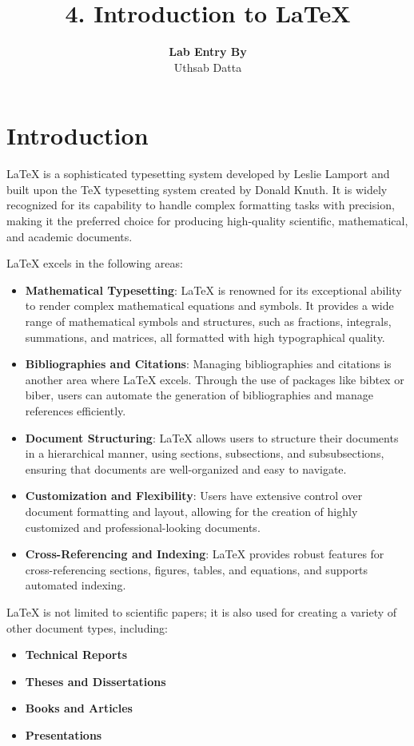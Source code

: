 \documentclass{article}
\title{\centering \LARGE \textbf{4. Introduction to LaTeX} \\[0.5cm]}
\author{\centering \Large \textbf{Lab Entry By} \\[0.5cm] \large Uthsab Datta}
\date{} %
\begin{document}
\maketitle

\section{Introduction}
LaTeX{} is a sophisticated typesetting system developed by Leslie Lamport and built upon the TeX typesetting system created by Donald Knuth. It is widely recognized for its capability to handle complex formatting tasks with precision, making it the preferred choice for producing high-quality scientific, mathematical, and academic documents.

LaTeX{} excels in the following areas:
\begin{itemize}
    \item \textbf{Mathematical Typesetting}: LaTeX{} is renowned for its exceptional ability to render complex mathematical equations and symbols. It provides a wide range of mathematical symbols and structures, such as fractions, integrals, summations, and matrices, all formatted with high typographical quality.
    
    \item \textbf{Bibliographies and Citations}: Managing bibliographies and citations is another area where LaTeX{} excels. Through the use of packages like bibtex or biber, users can automate the generation of bibliographies and manage references efficiently.
    
    \item \textbf{Document Structuring}: LaTeX{} allows users to structure their documents in a hierarchical manner, using sections, subsections, and subsubsections, ensuring that documents are well-organized and easy to navigate.
    
    \item \textbf{Customization and Flexibility}: Users have extensive control over document formatting and layout, allowing for the creation of highly customized and professional-looking documents.
    
    \item \textbf{Cross-Referencing and Indexing}: LaTeX{} provides robust features for cross-referencing sections, figures, tables, and equations, and supports automated indexing.
\end{itemize}

LaTeX{} is not limited to scientific papers; it is also used for creating a variety of other document types, including:
\begin{itemize}
    \item \textbf{Technical Reports}
    \item \textbf{Theses and Dissertations}
    \item \textbf{Books and Articles}
    \item \textbf{Presentations}
\end{itemize}
\end{document}
